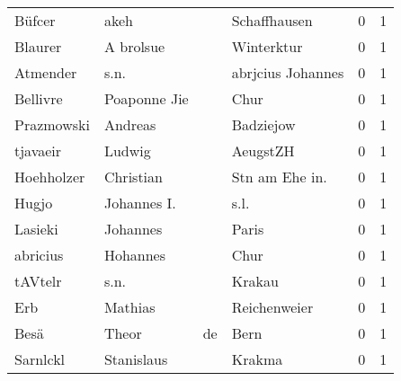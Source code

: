 \begin{tabular}{llllrr}
                   Büfcer &                               akeh &             &                                Schaffhausen &          0 &         1 \\
                  Blaurer &                          A brolsue &             &                                  Winterktur &          0 &         1 \\
                 Atmender &                               s.n. &             &                           abrjcius Johannes &          0 &         1 \\
                 Bellivre &                       Poaponne Jie &             &                                        Chur &          0 &         1 \\
               Prazmowski &                            Andreas &             &                                   Badziejow &          0 &         1 \\
                 tjavaeir &                             Ludwig &             &                                    AeugstZH &          0 &         1 \\
               Hoehholzer &                          Christian &             &                             Stn am Ehe in.  &          0 &         1 \\
                    Hugjo &                        Johannes I. &             &                                        s.l. &          0 &         1 \\
                  Lasieki &                           Johannes &             &                                       Paris &          0 &         1 \\
                 abricius &                           Hohannes &             &                                        Chur &          0 &         1 \\
                  tAVtelr &                               s.n. &             &                                      Krakau &          0 &         1 \\
                      Erb &                            Mathias &             &                                Reichenweier &          0 &         1 \\
                     Besä &                              Theor &          de &                                        Bern &          0 &         1 \\
                 Sarnlckl &                         Stanislaus &             &                                      Krakma &          0 &         1 \\

\end{tabular}
